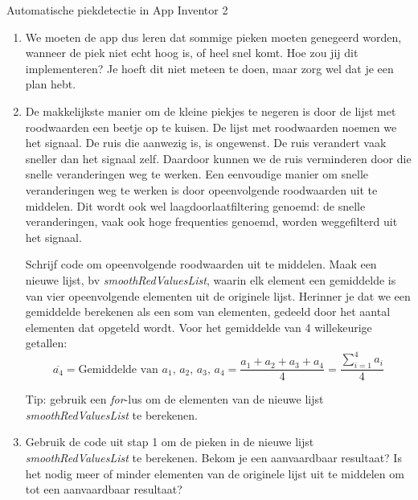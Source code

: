 \begin{opdracht}{Automatische piekdetectie in App Inventor 2}
\begin{enumerate}
\begin{opmerking}
	\end{opmerking}
	
	\begin{opmerking}
		Vaak is de lijst met roodwaarden een beetje \textquotedblleft ruizig\textquotedblright. Dit zorgt ervoor dat de app meer pieken detecteert dan wij zouden doen. Soms zien we een klein piekje in het signaal, dat we negeren, omdat het maar een kleine piek is, of omdat de piek te snel na een grote hartslagpiek komt. 
	\end{opmerking}

	\item We moeten de app dus leren dat sommige pieken moeten genegeerd worden, wanneer de piek niet echt hoog is, of heel snel komt. Hoe zou jij dit implementeren? Je hoeft dit niet meteen te doen, maar zorg wel dat je een plan hebt.
	
	\item De makkelijkste manier om de kleine piekjes te negeren is door de lijst met roodwaarden een beetje op te kuisen. De lijst met roodwaarden noemen we het signaal. De ruis die aanwezig is, is ongewenst. De ruis verandert vaak sneller dan het signaal zelf. Daardoor kunnen we de ruis verminderen door die snelle veranderingen weg te werken. Een eenvoudige manier om snelle veranderingen weg te werken is door opeenvolgende roodwaarden uit te middelen. Dit wordt ook wel laagdoorlaatfiltering genoemd: de snelle veranderingen, vaak ook hoge frequenties genoemd, worden weggefilterd uit het signaal.
	
	Schrijf code om opeenvolgende roodwaarden uit te middelen. Maak een nieuwe lijst, bv \emph{smoothRedValuesList}, waarin elk element een gemiddelde is van vier opeenvolgende elementen uit de originele lijst. Herinner je dat we een gemiddelde berekenen als een som van elementen, gedeeld door het aantal elementen dat opgeteld wordt.
	Voor het gemiddelde van 4 willekeurige getallen:
	\begin{equation*}
	\overline{a_4} = \text{Gemiddelde van $a_1$, $a_2$, $a_3$, $a_4$} = \frac{a_1+a_2+a_3+a_4}{4} = \frac{\sum_{i=1}^{4} a_i}{4}
	\end{equation*}
	
	\begin{opmerking}
		Tip: gebruik een \emph{for}-lus om de elementen van de nieuwe lijst \emph{smoothRedValuesList} te berekenen.
	\end{opmerking}

	\item Gebruik de code uit stap 1 om de pieken in de nieuwe lijst \emph{smoothRedValuesList} te berekenen. Bekom je een aanvaardbaar resultaat? Is het nodig meer of minder elementen van de originele lijst uit te middelen om tot een aanvaardbaar resultaat?
	

\end{enumerate}
\end{opdracht}
